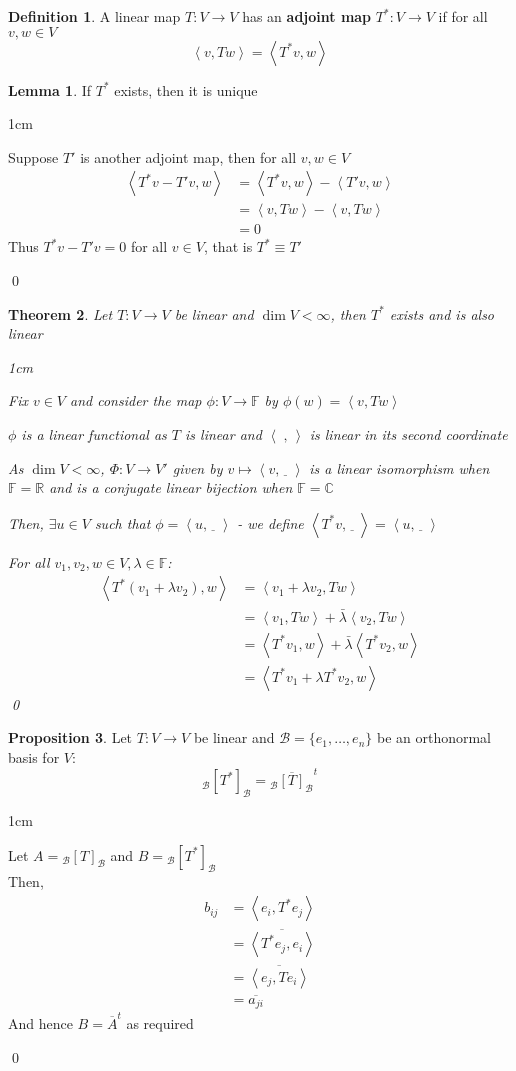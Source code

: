 \documentclass[11pt, a4paper]{report}
\makeatletter
\numberwithin{equation}{section}
\newcommand{\R}{\mathbb{R}}
\newcommand{\B}{\mathcal{B}}
\newcommand{\C}{\mathbb{C}}
\newcommand{\F}{\mathbb{F}}
\newcommand{\blnk}{\underline{\;\;}\,}
\newcommand{\spn}[1]{\left\langle #1 \right\rangle}
\newcommand{\spb}{\spn{\;,\,}}
\numberwithin{equation}{subsection}
\theoremstyle{plain}
\newtheorem{thm}{Theorem}[chapter] %
\theoremstyle{definition}
\newtheorem{defn}{Definition}[chapter]
\newtheorem{lem}[thm]{Lemma}
\newtheorem{prop}[thm]{Proposition}
\theoremstyle{remark}
\newtheorem*{prf}{Proof}
\renewenvironment{prf}[1][\proofname]{\par
  \vspace{-\topsep}%
  \normalfont
  \topsep0pt \partopsep0pt %
  \trivlist
  \item[\hskip\labelsep
        \itshape
    #1\@addpunct{.}]\ignorespaces
}{%
  \popQED\endtrivlist\@endpefalse
  \addvspace{6pt plus 6pt} %
}
\newcommand{\pr}[1]{\begin{adjustwidth}{1cm}{} \begin{prf} #1 \end{prf} \end{adjustwidth}}
\makeatother
\begin{document}
\begin{defn}
A linear map $T: V \to V$ has an \textbf{adjoint map} $T^*: V \to V$ if for all $v,w \in V$
$$\spn{v, Tw} = \spn{T^*v, w}$$
\end{defn}

\begin{lem}
If $T^*$ exists, then it is unique
\pr{
Suppose $T'$ is another adjoint map, then for all $v,w \in V$
\begin{align*}
\spn{T^*v - T'v, w}	&= \spn{T^*v, w} - \spn{T'v, w}\\
					&= \spn{v, Tw} - \spn{v, Tw}\\
					&= 0
\end{align*}
Thus $T^*v - T'v = 0$ for all $v \in V$, that is $T^* \equiv T'$
}\qed
\end{lem}

\newpage

\begin{thm}
Let $T: V \to V$ be linear and $\dim V < \infty$, then $T^*$ exists and is also linear

\pr{
Fix $v \in V$ and consider the map $\phi: V \to \F$ by $\phi(w) = \spn{v, Tw}$

$\phi$ is a linear functional as $T$ is linear and $\spb$ is linear in its second coordinate

As $\dim V < \infty$, $\Phi: V \to V'$ given by $v \mapsto \spn{v, \blnk}$ is a linear isomorphism when $\F = \R$ and is a conjugate linear bijection when $\F = \C$

Then, $\exists u \in V$ such that $\phi = \spn{u, \blnk}$ - we define $\spn{T^*v, \blnk} = \spn{u, \blnk}$

For all $v_1, v_2, w \in V, \lambda \in \F$:
\begin{align*}
\spn{T^*(v_1 + \lambda v_2), w}	&= \spn{v_1 + \lambda v_2, Tw}\\
	&= \spn{v_1, Tw} + \bar{\lambda} \spn{v_2, Tw}\\
	&= \spn{T^*v_1, w} + \bar{\lambda} \spn{T^*v_2, w}\\
	&= \spn{T^*v_1 + \lambda T^*v_2, w}
\end{align*}\qed
}
\end{thm}

\begin{prop}
Let $T: V \to V$ be linear and $\B = \{ e_1, \ldots, e_n \}$ be an orthonormal basis for $V$:
$$_\B[T^*]_\B = {_\B\overline{[T]}_\B}^t$$

\pr{
Let $A = {_\B[T]_\B}$ and $B = {_\B[T^*]_\B}$\\ Then,
\begin{align*}
b_{ij}	&= \spn{e_i, T^*e_j}\\
		&= \overline{\spn{T^*e_j, e_i}}\\
		&= \overline{\spn{e_j, Te_i}}\\
		&= \overline{a_{ji}}
\end{align*}
And hence $B = \overline{A}^t$ as required
}\qed

\end{prop}
\end{document}
